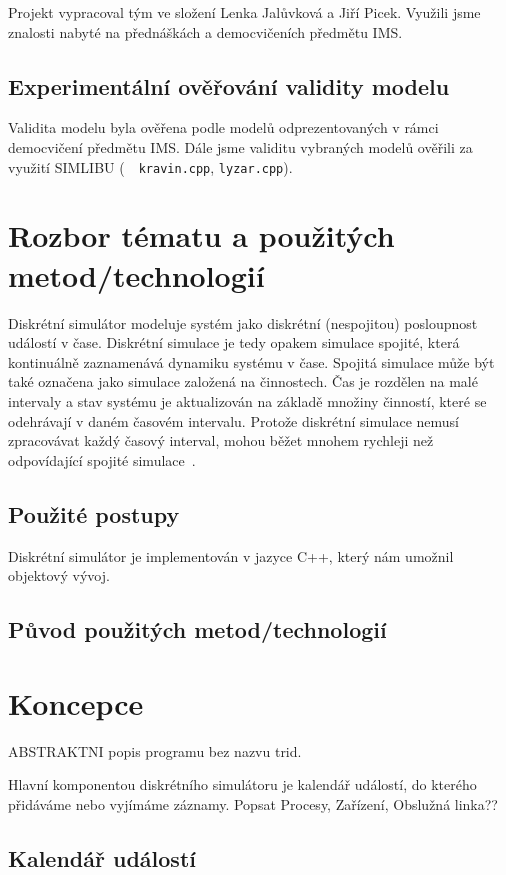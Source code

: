 \documentclass[12pt,a4paper,titlepage,final]{article}
\begin{document}
Projekt vypracoval tým ve složení Lenka Jalůvková a Jiří Picek. Využili jsme znalosti nabyté na přednáškách a democvičeních předmětu IMS.

\subsection{Experimentální ověřování validity modelu}

Validita modelu byla ověřena podle modelů odprezentovaných v rámci democvičení předmětu IMS. Dále jsme validitu vybraných modelů ověřili za využití SIMLIBU (~\cite{priklady}~\texttt{kravin.cpp}, \texttt{lyzar.cpp}).
 
\section{Rozbor tématu a použitých metod/technologií}

Diskrétní simulátor modeluje systém jako diskrétní (nespojitou) posloupnost událostí v čase. Diskrétní simulace je tedy opakem simulace spojité, která kontinuálně zaznamenává dynamiku systému v čase. Spojitá simulace může být také označena jako simulace založená na činnostech. Čas je rozdělen na malé intervaly a stav systému je aktualizován na základě množiny činností, které se odehrávají v daném časovém intervalu. Protože diskrétní simulace nemusí zpracovávat každý časový interval, mohou běžet mnohem rychleji než odpovídající spojité simulace~\cite{simulace.info}. 

\subsection{Použité postupy}

Diskrétní simulátor je implementován v jazyce C++, který nám umožnil objektový vývoj.

\subsection{Původ použitých metod/technologií}
\section{Koncepce}
ABSTRAKTNI popis programu bez nazvu trid.

Hlavní komponentou diskrétního simulátoru je kalendář událostí, do kterého přidáváme nebo vyjímáme záznamy. Popsat Procesy, Zařízení, Obslužná linka??

\subsection{Kalendář událostí}
\end{document}

